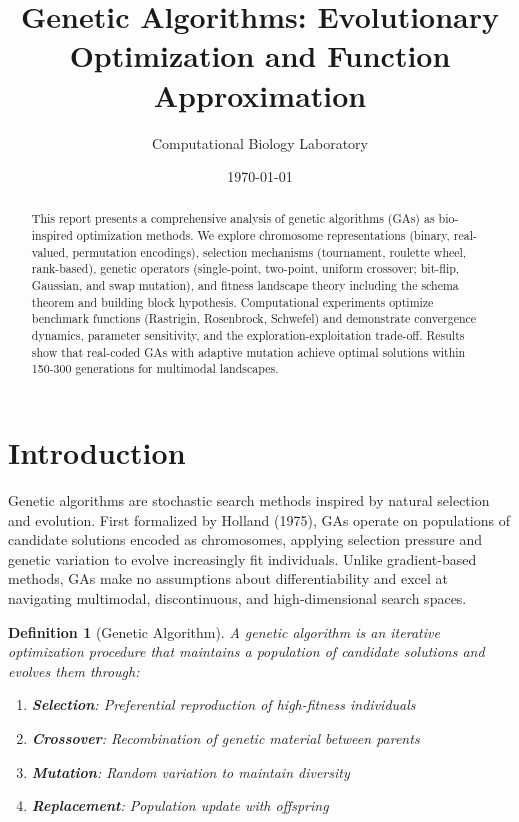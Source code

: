 \documentclass[a4paper, 11pt]{article}
\title{Genetic Algorithms: Evolutionary Optimization and Function Approximation}
\author{Computational Biology Laboratory}
\date{\today}
\newtheorem{definition}{Definition}[section]
\begin{document}
\maketitle

\begin{abstract}
This report presents a comprehensive analysis of genetic algorithms (GAs) as bio-inspired optimization methods. We explore chromosome representations (binary, real-valued, permutation encodings), selection mechanisms (tournament, roulette wheel, rank-based), genetic operators (single-point, two-point, uniform crossover; bit-flip, Gaussian, and swap mutation), and fitness landscape theory including the schema theorem and building block hypothesis. Computational experiments optimize benchmark functions (Rastrigin, Rosenbrock, Schwefel) and demonstrate convergence dynamics, parameter sensitivity, and the exploration-exploitation trade-off. Results show that real-coded GAs with adaptive mutation achieve optimal solutions within 150-300 generations for multimodal landscapes.
\end{abstract}

\section{Introduction}

Genetic algorithms are stochastic search methods inspired by natural selection and evolution. First formalized by Holland (1975), GAs operate on populations of candidate solutions encoded as chromosomes, applying selection pressure and genetic variation to evolve increasingly fit individuals. Unlike gradient-based methods, GAs make no assumptions about differentiability and excel at navigating multimodal, discontinuous, and high-dimensional search spaces.

\begin{definition}[Genetic Algorithm]
A genetic algorithm is an iterative optimization procedure that maintains a population of candidate solutions and evolves them through:
\begin{enumerate}
\item \textbf{Selection}: Preferential reproduction of high-fitness individuals
\item \textbf{Crossover}: Recombination of genetic material between parents
\item \textbf{Mutation}: Random variation to maintain diversity
\item \textbf{Replacement}: Population update with offspring
\end{enumerate}
\end{definition}
\end{document}
